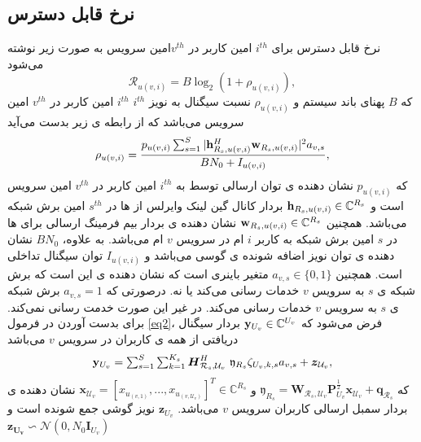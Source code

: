 \subsection{نرخ قابل دسترس}
نرخ قابل دسترس برای $i^{th}$ امین کاربر در $v^{th}$امین سرویس به صورت زیر نوشته می‌شود
\begin{equation}\label{eq1}
\mathcal{R}_{u(v,i)} = B \log_2({1+ \rho_{u(v,i)}}),
\end{equation}
  که $B$ پهنای باند سیستم و 
  $\rho_{u(v,i)}$
  نسبت سیگنال به نویز $i^{th}$
  $i^{th}$ 
  امین کاربر در
   $v^{th}$
   امین سرویس
  می‌باشد 
  که از رابطه ی زیر بدست می‌آید
 \begin{equation}\label{eq2}
\rho_{u(v,i)} =  \frac{p_{u(v,i)}\sum_{s=1}^{S}|\bold{h}_{R_s,u(v,i)}^H \bold{w}_{R_s,u(v,i)}|^2 a_{v,s}}{BN_0 + I_{u(v,i)}},
\end{equation}
که   $p_{u(v,i)}$
نشان دهنده ی توان ارسالی توسط  به 
$i^{th}$ 
  امین کاربر در
   $v^{th}$
   امین سرویس
   است و 
 $\bold{h}_{R_s,u(v,i)} \in \mathbb{C}^{{R}_s}$
 بردار کانال گین لینک وایرلس از  ها در 
$s^{th}$
امین برش شبکه می‌باشد.
 همچنین 
$\bold{w}_{R_s,u(v,i)} \in \mathbb{C}^{{R}_s}$
نشان دهنده ی بردار بیم فرمینگ ارسالی برای ها در $s$ امین برش شبکه به کاربر $i$ ام در سرویس $v$ ام می‌باشد.
   به علاوه، $BN_0$
   نشان دهنده ی توان نویز اضافه شونده ی گوسی می‌باشد و $I_{u(v,i)}$
   توان سیگنال تداخلی است.
همچنین $a_{v,s} \in \{0,1\}$
متغیر باینری است که نشان دهنده ی این است که برش شبکه ی $s$ به سرویس $v$ خدمات رسانی می‌کند یا نه.
درصورتی که 
 $a_{v,s} =1$
 برش شبکه ی $s$ به سرویس $v$ خدمات رسانی می‌کند. در غیر این صورت خدمت رسانی نمی‌کند.
\newline
برای بدست آوردن  در فرمول \eqref{eq2}، 
فرض می‌شود که 
 $\bold{y}_{U_v}\in \mathbb{C}^{U_v} $
 بردار سیگنال دریافتی از همه ی کاربران در سرویس $v$ می‌باشد 
\begin{equation}\label{eq3}
\textstyle \bold{y}_{U_v} = \sum_{s = 1}^{S}\sum_{k=1}^{K_s} \boldsymbol{H}^H_{\mathcal{R}_s,\mathcal{U}_v} \
\mathfrak{y}_{R_s}\zeta_{U_v,k,s} a_{v,s}+ \boldsymbol{z}_{\mathcal{U}_v},
\end{equation}
که $\mathfrak{y}_{R_s} = \boldsymbol{W}_{\mathcal{R}_s,\mathcal{U}_v}\boldsymbol{P}_{U_v}^{\frac{1}{2}}\boldsymbol{x}_{\mathcal{U}_v}+ \boldsymbol{q}_{\mathcal{R}_s}$
و 
$\boldsymbol{x}_{ \mathcal{U}_v} = [x_{ u_{(v,1)}},...,x_{ u_{(v,\mathcal{U}_v)}}]^T \in \mathbb{C}^{{R}_s } $
نشان دهنده ی بردار سمبل ارسالی کاربران سرویس $v$ می‌باشد.
$\boldsymbol{z}_{U_v}$
نویز گوشی جمع شونده است و
$\boldsymbol{z_{U_v}} \backsim \mathcal{N}(0,N_0\boldsymbol{I}_{{U}_v})$
